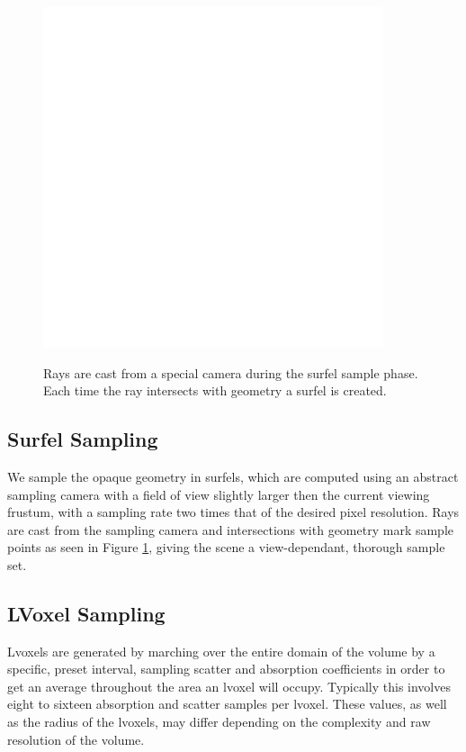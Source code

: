 \documentclass[12pt]{ucthesis}
\newcommand{\captionfonts}{\small\bf\ssp}
\begin{document}
\begin{figure}[h!]
    \centering
    \includegraphics[width=100mm]{img/diag/surfel_samp.pdf}
    \captionfonts
    \caption{Rays are cast from a special camera during the surfel sample phase.  Each time the ray intersects with geometry a surfel is created.}
    \label{fig:surf_sample}
\end{figure}

\subsection{Surfel Sampling}

We sample the opaque geometry in surfels, which are computed using an abstract sampling camera with a field of view slightly larger then the current viewing frustum, with a sampling rate two times that of the desired pixel resolution.  Rays are cast from the sampling camera and intersections with geometry mark sample points as seen in Figure \ref{fig:surf_sample}, giving the scene a view-dependant, thorough sample set.

\subsection{LVoxel Sampling}

Lvoxels are generated by marching over the entire domain of the volume by a specific, preset interval, sampling scatter and absorption coefficients in order to get an average throughout the area an lvoxel will occupy.  Typically this involves eight to sixteen absorption and scatter samples per lvoxel.  These values, as well as the radius of the lvoxels, may differ depending on the complexity and raw resolution of the volume.
\end{document}
